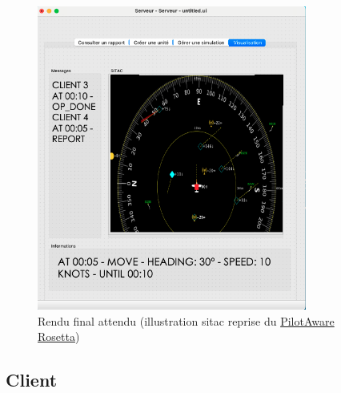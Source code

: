 \documentclass[12pt,a4paper]{scrartcl}
\theoremstyle{plain}
\theoremstyle{definition}
\theoremstyle{remark}
\begin{document}
		\begin{figure}[H]
		\centering
		\includegraphics[height=10cm]{img/maquette/serveur/final.png} 
			\caption{Rendu final attendu (illustration sitac reprise du \href{https://fr.pilotaware.com/post/strategic-vs-tactical-awareness}{PilotAware Rosetta})}
	\end{figure}
	
		\subsection{Client}
	
\end{document}
